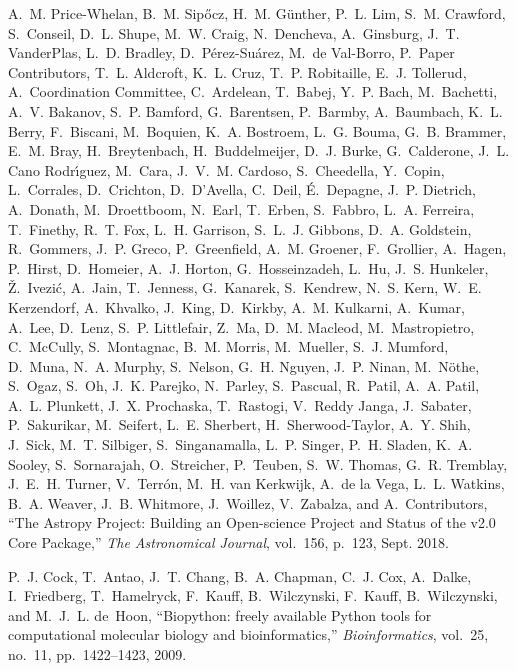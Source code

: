 \documentclass[twocolumn]{article}
\begin{document}
\begin{thebibliography}{10}
A.~M. {Price-Whelan}, B.~M. {Sip{\H{o}}cz}, H.~M. {G{\"u}nther}, P.~L. {Lim},
  S.~M. {Crawford}, S.~{Conseil}, D.~L. {Shupe}, M.~W. {Craig}, N.~{Dencheva},
  A.~{Ginsburg}, J.~T. {VanderPlas}, L.~D. {Bradley},
  D.~{P{\'e}rez-Su{\'a}rez}, M.~{de Val-Borro}, P.~{Paper Contributors}, T.~L.
  {Aldcroft}, K.~L. {Cruz}, T.~P. {Robitaille}, E.~J. {Tollerud},
  A.~{Coordination Committee}, C.~{Ardelean}, T.~{Babej}, Y.~P. {Bach},
  M.~{Bachetti}, A.~V. {Bakanov}, S.~P. {Bamford}, G.~{Barentsen}, P.~{Barmby},
  A.~{Baumbach}, K.~L. {Berry}, F.~{Biscani}, M.~{Boquien}, K.~A. {Bostroem},
  L.~G. {Bouma}, G.~B. {Brammer}, E.~M. {Bray}, H.~{Breytenbach},
  H.~{Buddelmeijer}, D.~J. {Burke}, G.~{Calderone}, J.~L. {Cano
  Rodr{\'\i}guez}, M.~{Cara}, J.~V.~M. {Cardoso}, S.~{Cheedella}, Y.~{Copin},
  L.~{Corrales}, D.~{Crichton}, D.~{D{\textquoteright}Avella}, C.~{Deil},
  {\'E}.~{Depagne}, J.~P. {Dietrich}, A.~{Donath}, M.~{Droettboom}, N.~{Earl},
  T.~{Erben}, S.~{Fabbro}, L.~A. {Ferreira}, T.~{Finethy}, R.~T. {Fox}, L.~H.
  {Garrison}, S.~L.~J. {Gibbons}, D.~A. {Goldstein}, R.~{Gommers}, J.~P.
  {Greco}, P.~{Greenfield}, A.~M. {Groener}, F.~{Grollier}, A.~{Hagen},
  P.~{Hirst}, D.~{Homeier}, A.~J. {Horton}, G.~{Hosseinzadeh}, L.~{Hu}, J.~S.
  {Hunkeler}, {\v{Z}}.~{Ivezi{\'c}}, A.~{Jain}, T.~{Jenness}, G.~{Kanarek},
  S.~{Kendrew}, N.~S. {Kern}, W.~E. {Kerzendorf}, A.~{Khvalko}, J.~{King},
  D.~{Kirkby}, A.~M. {Kulkarni}, A.~{Kumar}, A.~{Lee}, D.~{Lenz}, S.~P.
  {Littlefair}, Z.~{Ma}, D.~M. {Macleod}, M.~{Mastropietro}, C.~{McCully},
  S.~{Montagnac}, B.~M. {Morris}, M.~{Mueller}, S.~J. {Mumford}, D.~{Muna},
  N.~A. {Murphy}, S.~{Nelson}, G.~H. {Nguyen}, J.~P. {Ninan}, M.~{N{\"o}the},
  S.~{Ogaz}, S.~{Oh}, J.~K. {Parejko}, N.~{Parley}, S.~{Pascual}, R.~{Patil},
  A.~A. {Patil}, A.~L. {Plunkett}, J.~X. {Prochaska}, T.~{Rastogi}, V.~{Reddy
  Janga}, J.~{Sabater}, P.~{Sakurikar}, M.~{Seifert}, L.~E. {Sherbert},
  H.~{Sherwood-Taylor}, A.~Y. {Shih}, J.~{Sick}, M.~T. {Silbiger},
  S.~{Singanamalla}, L.~P. {Singer}, P.~H. {Sladen}, K.~A. {Sooley},
  S.~{Sornarajah}, O.~{Streicher}, P.~{Teuben}, S.~W. {Thomas}, G.~R.
  {Tremblay}, J.~E.~H. {Turner}, V.~{Terr{\'o}n}, M.~H. {van Kerkwijk}, A.~{de
  la Vega}, L.~L. {Watkins}, B.~A. {Weaver}, J.~B. {Whitmore}, J.~{Woillez},
  V.~{Zabalza}, and A.~{Contributors}, ``{The Astropy Project: Building an
  Open-science Project and Status of the v2.0 Core Package},'' {\em The
  Astronomical Journal}, vol.~156, p.~123, Sept. 2018.

P.~J. Cock, T.~Antao, J.~T. Chang, B.~A. Chapman, C.~J. Cox, A.~Dalke,
  I.~Friedberg, T.~Hamelryck, F.~Kauff, B.~Wilczynski, F.~Kauff, B.~Wilczynski,
  and M.~J.~L. de~Hoon, ``Biopython: freely available {Python} tools for
  computational molecular biology and bioinformatics,'' {\em Bioinformatics},
  vol.~25, no.~11, pp.~1422--1423, 2009.


\end{thebibliography}
\end{document}
